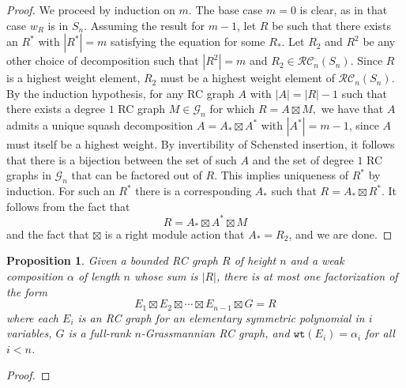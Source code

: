 \documentclass{amsart}
\newtheorem{proposition}[lemma]{Proposition}
\theoremstyle{definition}
\theoremstyle{remark}
\numberwithin{equation}{section}
\DeclareMathOperator{\sch}{\mathfrak{S}}
\newcommand{\BRC}{\mathcal{BRC}}
\newcommand{\RC}{\mathcal{RC}}
\newcommand{\grass}{\mathcal{G}}
\newcommand{\wof}[1]{w_{#1}}
\newcommand{\wtt}{\mathtt{wt}}
\begin{document}
\begin{proof}
We proceed by induction on $m$. The base case $m=0$ is clear, as in that case $\wof{R}$ is in $S_n$. Assuming the result for $m-1$, let $R$ be such that there exists an $R^\ast$ with $|R^\ast|=m$ satisfying the equation for some $R_*$. Let $R_2$ and $R^2$ be any other choice of decomposition such that $|R^2|=m$ and $R_2\in \RC_n(S_n)$. Since $R$ is a highest weight element, $R_2$ must be a highest weight element of $\RC_n(S_n)$. By the induction hypothesis, for any RC graph $A$ with $|A| = |R|-1$ such that there exists a degree $1$ RC graph $M\in\grass_n$ for which
$R = A \boxtimes M,$ we have that $A$ admits a unique squash decomposition $A = A_\ast \boxtimes A^\ast$ with $|A^\ast|=m-1$, since $A$ must itself be a highest weight. By invertibility of Schensted insertion, it follows that there is a bijection between the set of such $A$ and the set of degree $1$ RC graphs in $\grass_n$ that can be factored out of $R$. This implies uniqueness of $R^*$  by induction. For such an $R^*$ there is a corresponding $A_*$ such that $R = A_* \boxtimes R^*$. It follows from the fact that
$$R=A_*\boxtimes A^*\boxtimes M$$
and the fact that $\boxtimes$ is a right module action that $A_*=R_2$, and we are done.
\end{proof}

\begin{proposition}\label{proposition:unique-factorization}
Given a bounded RC graph $R$ of height $n$ and a weak composition $\alpha$ of length $n$ whose sum is $|R|$, there is at most one factorization of the form
$$E_1\boxtimes E_2\boxtimes \cdots \boxtimes E_{n-1}\boxtimes G = R$$
where each $E_i$ is an RC graph for an elementary symmetric polynomial in $i$ variables, $G$ is a full-rank $n$-Grassmannian RC graph, and $\wtt(E_i) = \alpha_i$ for all $i<n$.
\end{proposition}
\begin{proof}

\end{proof}
\end{document}
